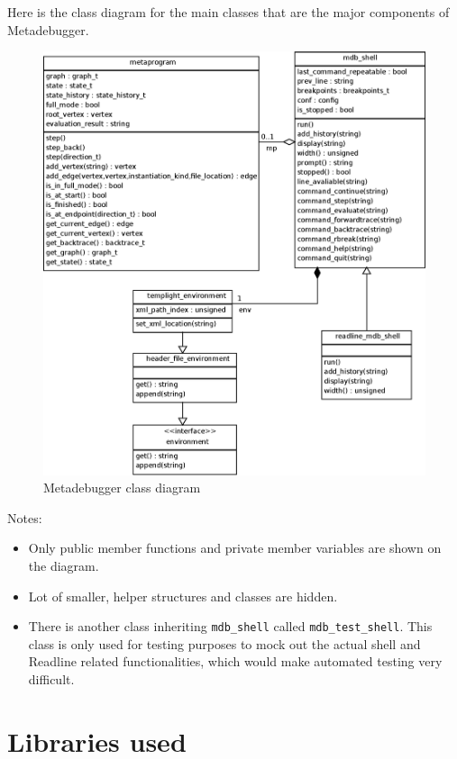Here is the class diagram for the main classes that are the major components of
Metadebugger.

\begin{figure}[H]
    \centering
    \includegraphics[width=\textwidth]{img/mdb_class_diagram.eps}
    \caption{Metadebugger class diagram}
\end{figure}

\noindent
Notes:
\begin{itemize}
    \item
        Only public member functions and private member variables are shown
        on the diagram.
    \item
        Lot of smaller, helper structures and classes are hidden.
    \item
        There is another class inheriting \texttt{mdb\_shell} called
        \texttt{mdb\_test\_shell}. This class is only used for testing
        purposes to mock out the actual shell and Readline related
        functionalities, which would make automated testing very difficult.
\end{itemize}

\section{Libraries used}

